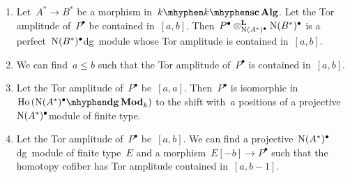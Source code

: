 \begin{refsection}
\begin{proposition}
\begin{enumerate}
    \item\label{enumerate:Tor-amplitude-4} Let~$A^*\to B^*$ be a morphism in~$k\mhyphen\scAlg$. Let the Tor amplitude of~$P^\bullet$ be contained in~$[a,b]$. Then~$P^\bullet\otimes_{\operatorname{N}(A^*)^\bullet}^{\mathbf{L}}\operatorname{N}(B^*)^\bullet$ is a perfect~$\operatorname{N}(B^*)^\bullet$\dash dg~module whose Tor amplitude is contained in~$[a,b]$.
    \item\label{enumerate:Tor-amplitude-5} We can find~$a\leq b$ such that the Tor amplitude of~$P^\bullet$ is contained in~$[a,b]$.
    \item\label{enumerate:Tor-amplitude-6} Let the Tor amplitude of~$P^\bullet$ be~$[a,a]$. Then~$P^\bullet$ is isomorphic in~$\Ho({\nerve(A^*)^\bullet}\mhyphen\dgMod_k)$ to the shift with~$a$ positions of a projective~$\operatorname{N}(A^*)^\bullet$\dash module of finite type.
    \item\label{enumerate:Tor-amplitude-7} Let the Tor amplitude of~$P^\bullet$ be~$[a,b]$. We can find a projective~$\operatorname{N}(A^*)^\bullet$\dash dg~module of finite type~$E$ and a morphism~$E[-b]\to P^\bullet$ such that the homotopy cofiber has Tor amplitude contained in~$[a,b-1]$.
  \end{enumerate}
\end{proposition}



\end{refsection}
